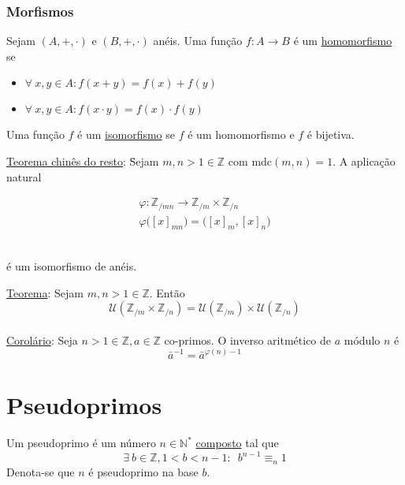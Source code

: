 \documentclass{article}
\begin{document}
\subsubsection{Morfismos}
Sejam $(A, +, \cdot)$ e $(B, +, \cdot)$ anéis. Uma função $f: A \to B$ é um \uline{homomorfismo} se
\begin{itemize}
  \item $\forall\: x,y \in A: f(x+y) = f(x) + f(y)$
  \item $\forall\: x,y \in A: f(x \cdot y) = f(x) \cdot f(y)$
\end{itemize}
\vspace{5pt}
Uma função $f$ é um \uline{isomorfismo} se $f$ é um homomorfismo e $f$ é bijetiva. \\[5pt]
\begin{tabbing}
  \uline{Teorema chinês do resto}: \= Sejam $m,n > 1 \in \mathbb{Z}$ com $\text{mdc}(m,n) = 1$. A aplicação natural \\[-5pt]
  \begin{minipage}{\linewidth}
    \begin{gather*}
      \varphi: \mathbb{Z}_{/mn} \to \mathbb{Z}_{/m} \times \mathbb{Z}_{/n} \\
      \varphi \big( {[x]}_{mn} \big) = \big( {[x]}_{m}, {[x]}_{n} \big)
    \end{gather*}
  \end{minipage} \\[10pt]
  \> é um isomorfismo de anéis.
\end{tabbing}
\vspace{10pt}
\uline{Teorema}: Sejam $m,n > 1 \in \mathbb{Z}$. Então
\[ \mathcal{U} \left( \mathbb{Z}_{/m} \times \mathbb{Z}_{/n} \right) = \mathcal{U} \left( \mathbb{Z}_{/m} \right) \times \mathcal{U} \left( \mathbb{Z}_{/n} \right) \]
\\
\uline{Corolário}: Seja $n > 1 \in \mathbb{Z}, a \in \mathbb{Z}$ co-primos. O inverso aritmético de $a$ módulo $n$ é
\[ \bar{a}^{-1} = \bar{a}^{\varphi(n) - 1} \]



\section{Pseudoprimos}
Um pseudoprimo é um número $n \in \mathbb{N}^*$ \uline{composto} tal que
\[ \exists\: b \in \mathbb{Z}, 1 < b < n - 1:\enspace b^{n - 1} \equiv_n 1 \]
Denota-se que $n$ é pseudoprimo na base $b$.
\end{document}
